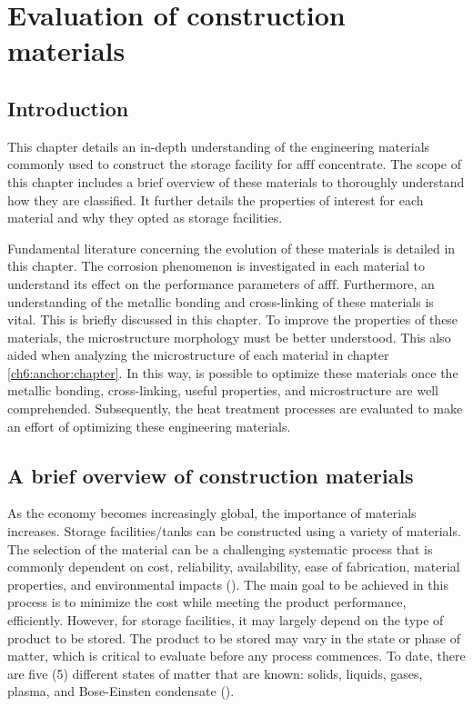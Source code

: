 \chapter{Evaluation of construction materials}
\section{Introduction}
This chapter details an in-depth understanding of the engineering materials commonly used to construct the storage facility for \acrshort{afff} concentrate. The scope of this chapter includes a brief overview of these materials to thoroughly understand how they are classified. It further details the properties of interest for each material and why they opted as storage facilities.

Fundamental literature concerning the evolution of these materials is detailed in this chapter. The corrosion phenomenon is investigated in each material to understand its effect on the performance parameters of \acrshort{afff}. Furthermore, an understanding of the metallic bonding and cross-linking of these materials is vital. This is briefly discussed in this chapter. To improve the properties of these materials, the microstructure morphology must be better understood. This also aided when analyzing the microstructure of each material in chapter \ref{ch6:anchor:chapter}. In this way, is possible to optimize these materials once the metallic bonding, cross-linking, useful properties, and microstructure are well comprehended. Subsequently, the heat treatment processes are evaluated to make an effort of optimizing these engineering materials.

\section{A brief overview of construction materials}
As the economy becomes increasingly global, the importance of materials increases. Storage facilities/tanks can be constructed using a variety of materials. The selection of the material can be a challenging systematic process that is commonly dependent on cost, reliability, availability, ease of fabrication, material properties, and environmental impacts (\cite{hench2005biomaterials}).  The main goal to be achieved in this process is to minimize the cost while meeting the product performance, efficiently. However, for storage facilities, it may largely depend on the type of product to be stored. The product to be stored may vary in the state or phase of matter, which is critical to evaluate before any process commences. To date, there are five (5) different states of matter that are known: solids, liquids, gases, plasma, and Bose-Einsten condensate (\cite{ceruti2002states}).

